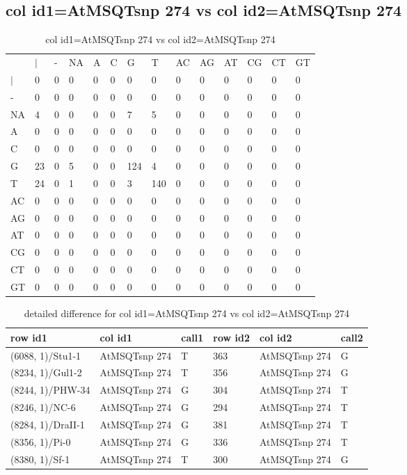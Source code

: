 \subsection{col id1=AtMSQTsnp 274 vs col id2=AtMSQTsnp 274}
\begin{center}
\begin{longtable}{|l|l|l|l|l|l|l|l|l|l|l|l|l|l|}
\caption{col id1=AtMSQTsnp 274 vs col id2=AtMSQTsnp 274} \label{table_dm810}\\
\hline
\\
\hline
&$|$&-&NA&A&C&G&T&AC&AG&AT&CG&CT&GT\\
$|$&0&0&0&0&0&0&0&0&0&0&0&0&0\\
-&0&0&0&0&0&0&0&0&0&0&0&0&0\\
NA&4&0&0&0&0&7&5&0&0&0&0&0&0\\
A&0&0&0&0&0&0&0&0&0&0&0&0&0\\
C&0&0&0&0&0&0&0&0&0&0&0&0&0\\
G&23&0&5&0&0&124&4&0&0&0&0&0&0\\
T&24&0&1&0&0&3&140&0&0&0&0&0&0\\
AC&0&0&0&0&0&0&0&0&0&0&0&0&0\\
AG&0&0&0&0&0&0&0&0&0&0&0&0&0\\
AT&0&0&0&0&0&0&0&0&0&0&0&0&0\\
CG&0&0&0&0&0&0&0&0&0&0&0&0&0\\
CT&0&0&0&0&0&0&0&0&0&0&0&0&0\\
GT&0&0&0&0&0&0&0&0&0&0&0&0&0\\
\hline
\end{longtable}
\end{center}

\begin{center}
\begin{longtable}{|l|l|l|l|l|l|}
\caption{detailed difference for col id1=AtMSQTsnp 274 vs col id2=AtMSQTsnp 274} \label{table_dm811}\\
\hline
row id1&col id1&call1&row id2&col id2&call2\\
\hline
(6088, 1)/Stu1-1&AtMSQTsnp 274&T&363&AtMSQTsnp 274&G\\
(8234, 1)/Gul1-2&AtMSQTsnp 274&T&356&AtMSQTsnp 274&G\\
(8244, 1)/PHW-34&AtMSQTsnp 274&G&304&AtMSQTsnp 274&T\\
(8246, 1)/NC-6&AtMSQTsnp 274&G&294&AtMSQTsnp 274&T\\
(8284, 1)/DraII-1&AtMSQTsnp 274&G&381&AtMSQTsnp 274&T\\
(8356, 1)/Pi-0&AtMSQTsnp 274&G&336&AtMSQTsnp 274&T\\
(8380, 1)/Sf-1&AtMSQTsnp 274&T&300&AtMSQTsnp 274&G\\
\hline
\end{longtable}
\end{center}

